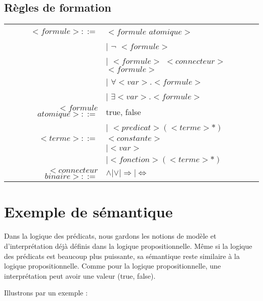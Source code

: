 \subsection{Règles de formation}
\begin{tabular}{rl}
$<formule>::=$ 	  &	$<formule$ $atomique>$ \\
				  & $\vert$ $\neg$ $<formule>$ \\
				  & $\vert$ $<formule>$ $<connecteur>$ $<formule>$ \\
				  & $\vert$ $\forall <var>.<formule>$ \\
				  & $\vert$ $\exists <var>.<formule>$ \\
$<formule$ $atomique>::=$ 
				  & true, false \\
				  & $\vert$ $<predicat>(<terme>*)$ \\
$<terme>::=$	  & $<constante>$ \\
				  & $\vert <var>$ \\
				  & $\vert <fonction>(<terme>*)$ \\
$<connecteur$ $binaire>::=$ 
				  & $\wedge \vert \vee \vert \Rightarrow \vert \Leftrightarrow$ \\

\end{tabular}

\section{Exemple de sémantique}
Dans la logique des prédicats, nous gardons les notions de modèle et d'interprétation déjà définis dans la logique propositionnelle. Même si la logique des prédicats est beaucoup plus puissante, sa sémantique reste similaire à la logique propositionnelle.
Comme pour la logique propositionnelle, une interprétation peut avoir une valeur (true, false).

Illustrons par un exemple : 

